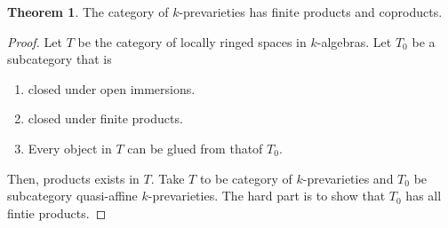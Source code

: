 \documentclass{article}
\theoremstyle{definition}
\newtheorem{theorem}{Theorem}[section]
\theoremstyle{definition}
\theoremstyle{definition}
\theoremstyle{definition}
\theoremstyle{definition}
\theoremstyle{definition}
\theoremstyle{definition}
\begin{document}
\begin{tcolorbox}[colback=red!5!white,colframe=red!30!white]
    \begin{theorem}
    The category of $k$-prevarieties has finite products and coproducts.
    \end{theorem}
    \end{tcolorbox}
\begin{proof}
    Let $T$ be the category of locally ringed spaces in $k$-algebras. Let $T_0$ be a subcategory that is 
    \begin{enumerate}
        \item closed under open immersions.
        \item closed under finite products.
        \item Every object in $T$ can be glued from thatof $T_0$.
    \end{enumerate}
    Then, products exists in $T$. Take $T$ to be category of $k$-prevarieties and $T_0$ be subcategory quasi-affine $k$-prevarieties. The hard part is to show that $T_0$ has all fintie products. 
\end{proof}
    
\end{document}
